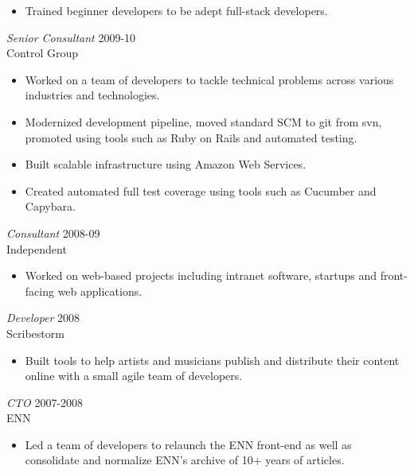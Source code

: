 \documentclass[line,margin]{res}
\begin{document}
\begin{resume}
\begin{itemize}
        \item
            Trained beginner developers to be adept full-stack developers.

    \end{itemize}

    {\sl Senior Consultant}
    \hfill 2009-10 \\
    Control Group
    \begin{itemize} \itemsep -2pt
        \item
            Worked on a team of developers to tackle technical problems across
            various industries and technologies.

        \item
            Modernized development pipeline, moved standard SCM to git from
            svn, promoted using tools such as Ruby on Rails and automated
            testing.

        \item
            Built scalable infrastructure using Amazon Web Services.

        \item
            Created automated full test coverage using tools such as Cucumber
            and Capybara.

    \end{itemize}

    {\sl Consultant}
    \hfill 2008-09 \\
    Independent
    \begin{itemize} \itemsep -2pt
        \item
            Worked on web-based projects including intranet software, startups
            and front-facing web applications.

    \end{itemize}

    \begin{samepage}
    {\sl Developer}
    \hfill 2008 \\
    Scribestorm
    \begin{itemize} \itemsep -2pt
        \item
            Built tools to help artists and musicians publish and distribute
            their content online with a small agile team of developers.

    \end{itemize}
    \end{samepage}

    {\sl CTO}
    \hfill 2007-2008 \\
    ENN
    \begin{itemize} \itemsep -2pt
        \item
            Led a team of developers to relaunch the ENN front-end as well as
            consolidate and normalize ENN's archive of 10+ years of articles.


\end{itemize}
\end{resume}
\end{document}
